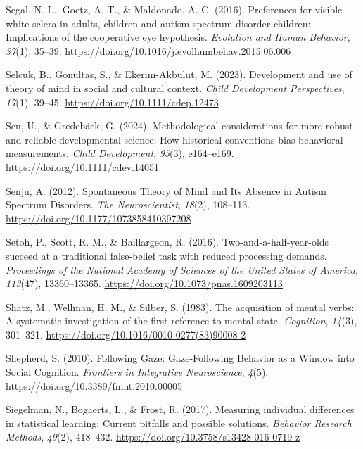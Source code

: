 \documentclass[
]{scrbook}
\newlength{\cslhangindent}
\newenvironment{CSLReferences}[2] %
 {\begin{list}{}{%
  \setlength{\itemindent}{0pt}
  \setlength{\leftmargin}{0pt}
  \setlength{\parsep}{0pt}
  \ifodd #1
   \setlength{\leftmargin}{\cslhangindent}
   \setlength{\itemindent}{-1\cslhangindent}
  \fi
  \setlength{\itemsep}{#2\baselineskip}}}
 {\end{list}}
\begin{document}
\begin{CSLReferences}{1}{0}
Segal, N. L., Goetz, A. T., \& Maldonado, A. C. (2016). Preferences for visible white sclera in adults, children and autism spectrum disorder children: Implications of the cooperative eye hypothesis. \emph{Evolution and Human Behavior}, \emph{37}(1), 35--39. \url{https://doi.org/10.1016/j.evolhumbehav.2015.06.006}

Selcuk, B., Gonultas, S., \& Ekerim-Akbulut, M. (2023). Development and use of theory of mind in social and cultural context. \emph{Child Development Perspectives}, \emph{17}(1), 39--45. \url{https://doi.org/10.1111/cdep.12473}

Sen, U., \& Gredebäck, G. (2024). Methodological considerations for more robust and reliable developmental science: {How} historical conventions bias behavioral measurements. \emph{Child Development}, \emph{95}(3), e164--e169. \url{https://doi.org/10.1111/cdev.14051}

Senju, A. (2012). Spontaneous {Theory} of {Mind} and {Its Absence} in {Autism Spectrum Disorders}. \emph{The Neuroscientist}, \emph{18}(2), 108--113. \url{https://doi.org/10.1177/1073858410397208}

Setoh, P., Scott, R. M., \& Baillargeon, R. (2016). Two-and-a-half-year-olds succeed at a traditional false-belief task with reduced processing demands. \emph{Proceedings of the National Academy of Sciences of the United States of America}, \emph{113}(47), 13360--13365. \url{https://doi.org/10.1073/pnas.1609203113}

Shatz, M., Wellman, H. M., \& Silber, S. (1983). The acquisition of mental verbs: {A} systematic investigation of the first reference to mental state. \emph{Cognition}, \emph{14}(3), 301--321. \url{https://doi.org/10.1016/0010-0277(83)90008-2}

Shepherd, S. (2010). Following {Gaze}: {Gaze-Following Behavior} as a {Window} into {Social Cognition}. \emph{Frontiers in Integrative Neuroscience}, \emph{4}(5). \url{https://doi.org/10.3389/fnint.2010.00005}

Siegelman, N., Bogaerts, L., \& Frost, R. (2017). Measuring individual differences in statistical learning: {Current} pitfalls and possible solutions. \emph{Behavior Research Methods}, \emph{49}(2), 418--432. \url{https://doi.org/10.3758/s13428-016-0719-z}


\end{CSLReferences}
\end{document}

